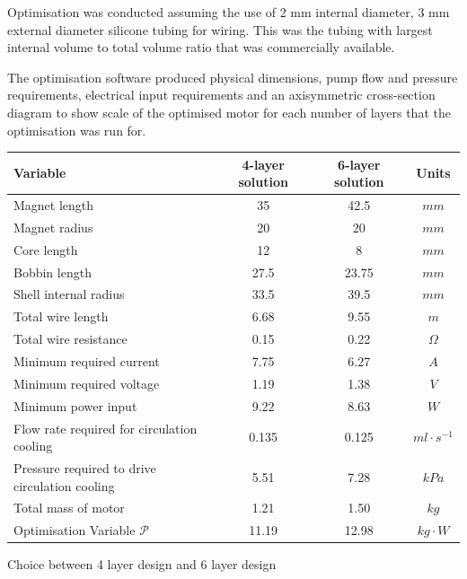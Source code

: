 \documentclass[a4paper,12pt]{article}
\begin{document}
Optimisation was conducted assuming the use of 2 mm internal diameter, 3 mm external diameter silicone tubing for wiring. This was the tubing with largest internal volume to total volume ratio that was commercially available.

The optimisation software produced physical dimensions, pump flow and pressure requirements, electrical input requirements and an axisymmetric cross-section diagram to show scale of the optimised motor for each number of layers that the optimisation was run for.

\begin{center}
	\begin{tabular}{M | c | c | c} 
		\textbf{Variable} & \textbf{4-layer solution} & \textbf{6-layer solution} & \textbf{Units} \\ [0.5ex] 
		\hline\hline
		Magnet length & 35 & 42.5 & $mm$ \\ 
		\hline
		Magnet radius & 20 & 20 & $mm$ \\ 
		\hline
		Core length & 12 & 8 & $mm$ \\ 
		\hline
		Bobbin length & 27.5 & 23.75 & $mm$ \\ 
		\hline
		Shell internal radius & 33.5 & 39.5 & $mm$ \\ 
		\hline
		Total wire length & 6.68 & 9.55& $m$ \\ 
		\hline
		Total wire resistance & 0.15 & 0.22 & $\Omega$ \\ 
		\hline
		Minimum required current & 7.75 & 6.27 & $A$ \\ 
		\hline
		Minimum required voltage & 1.19 & 1.38 & $V$ \\ 
		\hline
		Minimum power input & 9.22 & 8.63 & $W$ \\ 
		\hline
		Flow rate required for circulation cooling & 0.135 & 0.125 & $ml\cdot s^{-1}$ \\ 
		\hline
		Pressure required to drive circulation cooling & 5.51 & 7.28 & $kPa$ \\ 
		\hline
		Total mass of motor & 1.21 & 1.50 & $kg$ \\ 
		\hline
		Optimisation Variable $\mathcal{P}$ & 11.19 & 12.98 & $kg\cdot W$ \\ 
		\hline
	\end{tabular}
\end{center}

Choice between 4 layer design and 6 layer design
\end{document}
